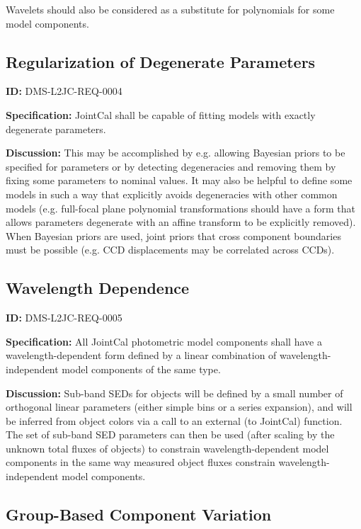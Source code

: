 \documentclass[SE,toc,lsstdraft]{lsstdoc}
\begin{document}
Wavelets should also be considered as a substitute for polynomials for some model components.

\subsection{Regularization of Degenerate Parameters}

\label{DMS-L2JC-REQ-0004}
\textbf{ID:} DMS-L2JC-REQ-0004

\textbf{Specification:}
JointCal shall be capable of fitting models with exactly degenerate parameters.

\textbf{Discussion:}
This may be accomplished by e.g. allowing Bayesian priors to be specified for parameters or by detecting degeneracies and removing them by fixing some parameters to nominal values.  It may also be helpful to define some models in such a way that explicitly avoids degeneracies with other common models (e.g. full-focal plane polynomial transformations should have a form that allows parameters degenerate with an affine transform to be explicitly removed).  When Bayesian priors are used, joint priors that cross component boundaries must be possible (e.g. CCD displacements may be correlated across CCDs).

\subsection{Wavelength Dependence}

\label{DMS-L2JC-REQ-0005}
\textbf{ID:} DMS-L2JC-REQ-0005

\textbf{Specification:}
All JointCal photometric model components shall have a wavelength-dependent form defined by a linear combination of wavelength-independent model components of the same type.

\textbf{Discussion:}
Sub-band SEDs for objects will be defined by a small number of orthogonal linear parameters (either simple bins or a series expansion), and will be inferred from object colors via a call to an external (to JointCal) function.  The set of sub-band SED parameters can then be used (after scaling by the unknown total fluxes of objects) to constrain wavelength-dependent model components in the same way measured object fluxes constrain wavelength-independent model components.

\subsection{Group-Based Component Variation}
\end{document}
